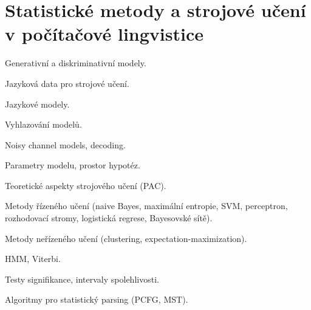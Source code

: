 \newpage
\section{Statistické metody a strojové učení v počítačové lingvistice}
\begin{pozadavky}
\begin{pitemize}
\item Generativní a diskriminativní modely.
\item Jazyková data pro strojové učení.
\item Jazykové modely.
\item Vyhlazování modelů.
\item Noisy channel models, decoding.
\item Parametry modelu, prostor hypotéz.
\item Teoretické aspekty strojového učení (PAC).
\item Metody řízeného učení (naive Bayes, maximální entropie, SVM, perceptron, rozhodovací stromy, logistická regrese, Bayesovské sítě).
\item Metody neřízeného učení (clustering, expectation-maximization).
\item HMM, Viterbi.
\item Testy signifikance, intervaly spolehlivosti.
\item Algoritmy pro statistický parsing (PCFG, MST).
\end{pitemize}
\end{pozadavky}